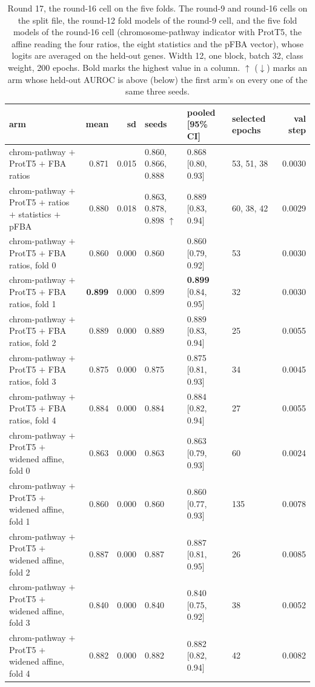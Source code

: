 \begin{table}[H]
  \centering
  \footnotesize
  \setlength{\tabcolsep}{2.5pt}
  \caption[Round 17, the round-16 cell on the five folds]{Round 17, the round-16 cell on the five folds. The round-9 and round-16 cells on the split file, the round-12 fold models of the round-9 cell, and the five fold models of the round-16 cell (chromosome-pathway indicator with ProtT5, the affine reading the four ratios, the eight statistics and the pFBA vector), whose logits are averaged on the held-out genes. Width 12, one block, batch 32, class weight, 200 epochs. Bold marks the highest value in a column. $\uparrow$ ($\downarrow$) marks an arm whose held-out AUROC is above (below) the first arm's on every one of the same three seeds.}
  \label{tab:w28}
  \begin{tabular}{@{}lrrlllr@{}}
    \hline
    arm & mean & sd & seeds & pooled [95\% CI] & selected epochs & val step \\
    \hline
    chrom-pathway $+$ ProtT5 $+$ FBA ratios & 0.871 & 0.015 & 0.860, 0.866, 0.888 & 0.868 [0.80, 0.93] & 53, 51, 38 & 0.0030 \\
    chrom-pathway $+$ ProtT5 $+$ ratios $+$ statistics $+$ pFBA & 0.880 & 0.018 & 0.863, 0.878, 0.898 $\uparrow$ & 0.889 [0.83, 0.94] & 60, 38, 42 & 0.0029 \\
    chrom-pathway $+$ ProtT5 $+$ FBA ratios, fold 0 & 0.860 & 0.000 & 0.860 & 0.860 [0.79, 0.92] & 53 & 0.0030 \\
    chrom-pathway $+$ ProtT5 $+$ FBA ratios, fold 1 & \textbf{0.899} & 0.000 & 0.899 & \textbf{0.899} [0.84, 0.95] & 32 & 0.0030 \\
    chrom-pathway $+$ ProtT5 $+$ FBA ratios, fold 2 & 0.889 & 0.000 & 0.889 & 0.889 [0.83, 0.94] & 25 & 0.0055 \\
    chrom-pathway $+$ ProtT5 $+$ FBA ratios, fold 3 & 0.875 & 0.000 & 0.875 & 0.875 [0.81, 0.93] & 34 & 0.0045 \\
    chrom-pathway $+$ ProtT5 $+$ FBA ratios, fold 4 & 0.884 & 0.000 & 0.884 & 0.884 [0.82, 0.94] & 27 & 0.0055 \\
    chrom-pathway $+$ ProtT5 $+$ widened affine, fold 0 & 0.863 & 0.000 & 0.863 & 0.863 [0.79, 0.93] & 60 & 0.0024 \\
    chrom-pathway $+$ ProtT5 $+$ widened affine, fold 1 & 0.860 & 0.000 & 0.860 & 0.860 [0.77, 0.93] & 135 & 0.0078 \\
    chrom-pathway $+$ ProtT5 $+$ widened affine, fold 2 & 0.887 & 0.000 & 0.887 & 0.887 [0.81, 0.95] & 26 & 0.0085 \\
    chrom-pathway $+$ ProtT5 $+$ widened affine, fold 3 & 0.840 & 0.000 & 0.840 & 0.840 [0.75, 0.92] & 38 & 0.0052 \\
    chrom-pathway $+$ ProtT5 $+$ widened affine, fold 4 & 0.882 & 0.000 & 0.882 & 0.882 [0.82, 0.94] & 42 & 0.0082 \\
    \hline
  \end{tabular}
\end{table}
